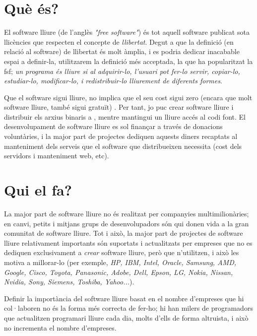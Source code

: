 \section{Què és?}

El software lliure (de l'anglès \emph{"free software"}) és tot aquell software publicat
sota llicències que respecten el concepte de \emph{llibertat}. Degut a que la definició
(en relació al software) de llibertat és molt àmplia, i es podria dedicar inacabable espai
a definir-la, utilitzarem la definició més acceptada, la que ha popularitzat la \ac{fsf}; \emph{un programa és lliure si al adquirir-lo, l'usuari pot fer-lo servir,
copiar-lo, estudiar-lo, modificar-lo, i redistribuir-lo lliurement de diferents formes}. \cite{wikifree}

Que el software sigui lliure, no implica que el seu cost sigui zero (encara que molt
software lliure, també sigui gratuït) \cite{sellingfree}. Per tant, jo puc crear software lliure i distribuir els arxius
binaris a , mentre mantingui un lliure accés al codi font. El desenvolupament de software
lliure es sol finançar a través de donacions voluntàries, i la major part de projectes dediquen
aquests diners recaptats al manteniment dels serveis que el software que distribueixen necessita
(cost dels servidors i manteniment web, etc).

\section{Qui el fa?}

La major part de software lliure no és realitzat per companyies multimilionàries; en canvi,
petits i mitjans grups de desenvolupadors són qui donen vida a la gran comunitat de software lliure.
Tot i això, la major part de projectes de software lliure relativament importants
són suportats i actualitzats per empreses que no es dediquen exclusivament a \emph{crear}
software lliure, però que n'utilitzen, i això les motiva a millorar-lo (per exemple, \emph{HP, IBM, Intel, Oracle, Samsung, AMD, Google, Cisco, Toyota, Panasonic, Adobe, Dell, Epson, LG, Nokia, Nissan, Nvidia, Sony, Siemens, Toshiba, Yahoo...}\cite{linuxmembers}).

Definir la importància del software lliure basat en el nombre d'empreses que hi col·laboren no és la forma més correcta de fer-ho; hi han milers de programadors que actualitzen programari lliure cada dia, molts d'ells de forma altruista, i això no incrementa el nombre d'empreses.

